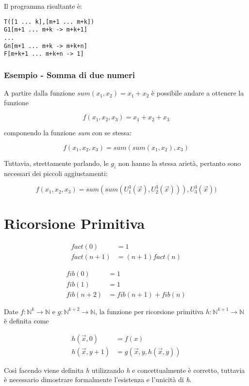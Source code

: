 Il programma risultante è:

\begin{lstlisting}[language=URM]
T([1 ... k],[m+1 ... m+k])
G1[m+1 ... m+k -> m+k+1]
...
Gn[m+1 ... m+k -> m+k+n]
F[m+k+1 ... m+k+n -> 1]
\end{lstlisting}

\subsubsection{Esempio - Somma di due numeri}\label{esempio}

A partire dalla funzione $sum(x_1, x_2) = x_1+x_2$ è possibile andare a ottenere la funzione

$$f(x_1, x_2, x_3) = x_1 + x_2 +x_3$$

componendo la funzione \textit{sum} con se stessa:

$$f(x_1, x_2, x_3) = sum(sum(x_1,x_2),x_3)$$

Tuttavia, strettamente parlando, le $g_i$ non hanno la stessa
arietà, pertanto sono necessari dei piccoli aggiustamenti:

$$f(x_1, x_2, x_3) = sum(sum(U_1^{3}(\vec{x}),U_2^3(\vec{x}))), U_3^3(\vec{x}))$$

\section{Ricorsione Primitiva}\label{ricorsione-primitiva}

\begin{align*}
	fact(0) &= 1 \\
	fact(n+1) &= (n+1)fact(n)
\end{align*}

\begin{align*}
	fib(0) &= 1 \\
	fib(1) &= 1 \\
	fib(n+2) &= fib(n+1) + fib(n)
\end{align*}

Date $f: \mathbb{N}^k \rightarrow \mathbb{N}$ e $g:\mathbb{N}^{k+2} \rightarrow \mathbb{N}$, la funzione per ricorsione primitiva $h: \mathbb{N}^{k+1} \rightarrow \mathbb{N}$ è definita come

\begin{align*}
	h(\vec{x}, 0) &= f(x) \\
	h(\vec{x}, y+1) &= g(\vec{x}, y, h(\vec{x},y))
\end{align*}

Così facendo viene definita \emph{h} utilizzando \emph{h} e
concettualmente è corretto, tuttavia è necessario dimostrare formalmente
l'esistenza e l'unicità di \emph{h}.

